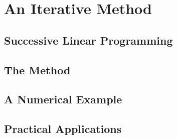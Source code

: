 \chapter{An Iterative Method}
\label{ch:slp}


\section{Successive Linear Programming}


\section{The Method}
\label{sec:problem}


\section{A Numerical Example}
\label{sec:example}


\section{Practical Applications}

